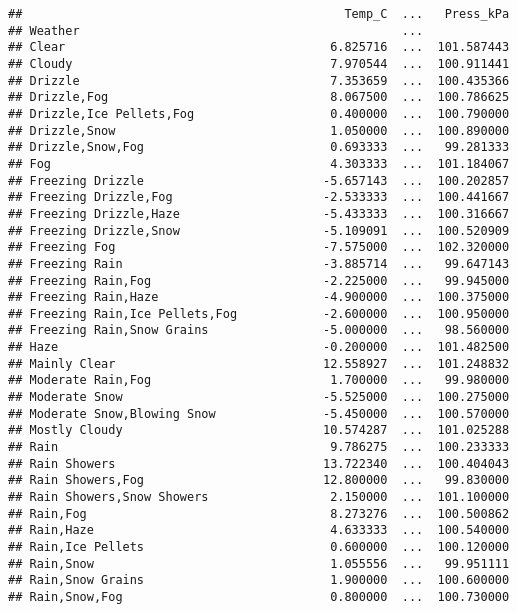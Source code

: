 \documentclass[
]{article}
\begin{document}
\begin{verbatim}
##                                             Temp_C  ...   Press_kPa
## Weather                                             ...            
## Clear                                     6.825716  ...  101.587443
## Cloudy                                    7.970544  ...  100.911441
## Drizzle                                   7.353659  ...  100.435366
## Drizzle,Fog                               8.067500  ...  100.786625
## Drizzle,Ice Pellets,Fog                   0.400000  ...  100.790000
## Drizzle,Snow                              1.050000  ...  100.890000
## Drizzle,Snow,Fog                          0.693333  ...   99.281333
## Fog                                       4.303333  ...  101.184067
## Freezing Drizzle                         -5.657143  ...  100.202857
## Freezing Drizzle,Fog                     -2.533333  ...  100.441667
## Freezing Drizzle,Haze                    -5.433333  ...  100.316667
## Freezing Drizzle,Snow                    -5.109091  ...  100.520909
## Freezing Fog                             -7.575000  ...  102.320000
## Freezing Rain                            -3.885714  ...   99.647143
## Freezing Rain,Fog                        -2.225000  ...   99.945000
## Freezing Rain,Haze                       -4.900000  ...  100.375000
## Freezing Rain,Ice Pellets,Fog            -2.600000  ...  100.950000
## Freezing Rain,Snow Grains                -5.000000  ...   98.560000
## Haze                                     -0.200000  ...  101.482500
## Mainly Clear                             12.558927  ...  101.248832
## Moderate Rain,Fog                         1.700000  ...   99.980000
## Moderate Snow                            -5.525000  ...  100.275000
## Moderate Snow,Blowing Snow               -5.450000  ...  100.570000
## Mostly Cloudy                            10.574287  ...  101.025288
## Rain                                      9.786275  ...  100.233333
## Rain Showers                             13.722340  ...  100.404043
## Rain Showers,Fog                         12.800000  ...   99.830000
## Rain Showers,Snow Showers                 2.150000  ...  101.100000
## Rain,Fog                                  8.273276  ...  100.500862
## Rain,Haze                                 4.633333  ...  100.540000
## Rain,Ice Pellets                          0.600000  ...  100.120000
## Rain,Snow                                 1.055556  ...   99.951111
## Rain,Snow Grains                          1.900000  ...  100.600000
## Rain,Snow,Fog                             0.800000  ...  100.730000

\end{verbatim}
\end{document}
